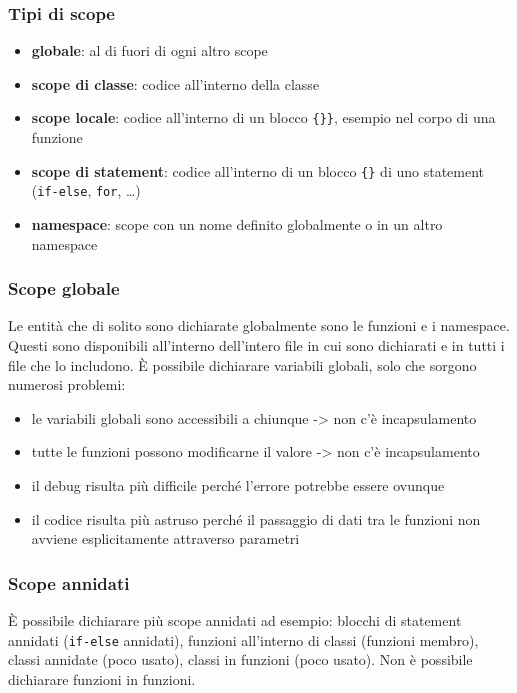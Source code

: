 \documentclass[a4paper]{article}
\begin{document}
\subsubsection*{Tipi di scope}
\begin{itemize}
	\item \textbf{globale}: al di fuori di ogni altro scope
	\item \textbf{scope di classe}: codice all'interno della classe
	\item \textbf{scope locale}: codice all'interno di un blocco \verb|{}}|, esempio nel corpo di una funzione
	\item \textbf{scope di statement}: codice all'interno di un blocco \verb|{}| di uno statement (\verb|if-else|, \verb|for|, \dots)
	\item \textbf{namespace}: scope con un nome definito globalmente o in un altro namespace
\end{itemize}

\subsubsection*{Scope globale}
Le entità che di solito sono dichiarate globalmente sono le funzioni e i namespace. Questi sono disponibili all'interno dell'intero
file in cui sono dichiarati e in tutti i file che lo includono. È possibile dichiarare variabili globali, solo che sorgono numerosi
problemi:
\begin{itemize}
	\item le variabili globali sono accessibili a chiunque -> non c'è incapsulamento
	\item tutte le funzioni possono modificarne il valore -> non c'è incapsulamento
	\item il debug risulta più difficile perché l'errore potrebbe essere ovunque
	\item il codice risulta più astruso perché il passaggio di dati tra le funzioni non avviene esplicitamente attraverso parametri
\end{itemize}

\subsubsection*{Scope annidati}
È possibile dichiarare più scope annidati ad esempio: blocchi di statement annidati (\verb|if-else| annidati), funzioni all'interno
di classi (funzioni membro), classi annidate (poco usato), classi in funzioni (poco usato). Non è possibile dichiarare funzioni in
funzioni.
\end{document}
